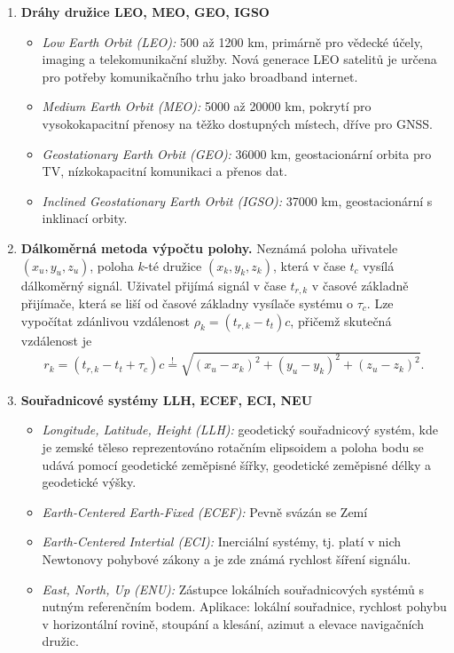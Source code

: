\documentclass[11pt,a4paper]{article}
\begin{document}
\begin{enumerate}
    \item \textbf{Dráhy družice LEO, MEO, GEO, IGSO}
    \begin{itemize}
        \item \emph{Low Earth Orbit (LEO):} 500 až 1200 km, primárně pro vědecké účely, imaging a telekomunikační služby. Nová generace LEO satelitů je určena pro potřeby komunikačního trhu jako broadband internet.
        \item \emph{Medium Earth Orbit (MEO):} 5000 až 20000 km, pokrytí pro vysokokapacitní přenosy na těžko dostupných místech, dříve pro GNSS.
        \item \emph{Geostationary Earth Orbit (GEO):} 36000 km, geostacionární orbita pro TV, nízkokapacitní komunikaci a přenos dat.
        \item \emph{Inclined Geostationary Earth Orbit (IGSO):} 37000 km, geostacionární s inklinací orbity.
    \end{itemize}
    
    \item \textbf{Dálkoměrná metoda výpočtu polohy.} Neznámá poloha uřivatele $(x_u,y_u,z_u)$, poloha $k$-té družice $(x_k,y_k,z_k)$, která v čase $t_c$ vysílá dálkoměrný signál. Uživatel přijímá signál v čase $t_{r,k}$ v časové základně přijímače, která se liší od časové základny vysílače systému o $\tau_c$. Lze vypočítat zdánlivou vzdálenost $\rho_k = (t_{r,k}-t_t)c$, přičemž skutečná vzdálenost je
    \begin{align}
        r_k = (t_{r,k}-t_t+\tau_c)c \overset{!}{=} \sqrt{(x_u-x_k)^2+(y_u-y_k)^2+(z_u-z_k)^2}.
    \end{align}
    
    \item \textbf{Souřadnicové systémy LLH, ECEF, ECI, NEU}
    \begin{itemize}
        \item \emph{Longitude, Latitude, Height (LLH):} geodetický souřadnicový systém, kde je zemské těleso reprezentováno rotačním elipsoidem a poloha bodu se udává pomocí geodetické zeměpisné šířky, geodetické zeměpisné délky a geodetické výšky.
        \item \emph{Earth-Centered Earth-Fixed (ECEF):} Pevně svázán se Zemí
        \item \emph{Earth-Centered Intertial (ECI):} Inerciální systémy, tj. platí v nich Newtonovy pohybové zákony a je zde známá rychlost šíření signálu.
        \item \emph{East, North, Up (ENU):} Zástupce lokálních souřadnicových systémů s nutným referenčním bodem. Aplikace: lokální souřadnice, rychlost pohybu v horizontální rovině, stoupání a klesání, azimut a elevace navigačních družic.
    \end{itemize}
    

\end{enumerate}
\end{document}
